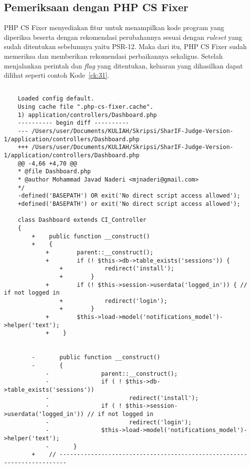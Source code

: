 \subsection{Pemeriksaan dengan PHP CS Fixer}
\label{subsec:periksa_otomatis}
PHP CS Fixer menyediakan fitur untuk menampilkan kode program yang diperiksa beserta dengan rekomendasi perubahannya sesuai dengan \textit{ruleset} yang sudah ditentukan sebelumnya yaitu PSR-12. Maka dari itu, PHP CS Fixer sudah memeriksa dan memberikan rekomendasi perbaikannya sekaligus. Setelah menjalankan perintah dan \textit{flag} yang ditentukan, keluaran yang dihasilkan dapat dilihat seperti contoh Kode~\ref{ck:31}.

\begin{lstlisting}[basicstyle=\ttfamily, frame=single,
	columns=fullflexible, keepspaces=true, breaklines=true, label=ck:31, caption=Contoh penggunaan PHP CS Fixer pada \textit{Dashboard.php}]
	
	Loaded config default.
	Using cache file ".php-cs-fixer.cache".
	1) application/controllers/Dashboard.php
	---------- begin diff ----------
	--- /Users/user/Documents/KULIAH/Skripsi/SharIF-Judge-Version-1/application/controllers/Dashboard.php
	+++ /Users/user/Documents/KULIAH/Skripsi/SharIF-Judge-Version-1/application/controllers/Dashboard.php
	@@ -4,66 +4,70 @@
	* @file Dashboard.php
	* @author Mohammad Javad Naderi <mjnaderi@gmail.com>
	*/
	-defined('BASEPATH') OR exit('No direct script access allowed');
	+defined('BASEPATH') or exit('No direct script access allowed');
	
	class Dashboard extends CI_Controller
	{
		+    public function __construct()
		+    {
			+        parent::__construct();
			+        if (! $this->db->table_exists('sessions')) {
				+            redirect('install');
				+        }
			+        if (! $this->session->userdata('logged_in')) { // if not logged in
				+            redirect('login');
				+        }
			+        $this->load->model('notifications_model')->helper('text');
			+    }
		
		
		-       public function __construct()
		-       {
			-               parent::__construct();
			-               if ( ! $this->db->table_exists('sessions'))
			-                       redirect('install');
			-               if ( ! $this->session->userdata('logged_in')) // if not logged in
			-                       redirect('login');
			-               $this->load->model('notifications_model')->helper('text');
			-       }
		+    // ------------------------------------------------------------------------
		

\end{lstlisting}
